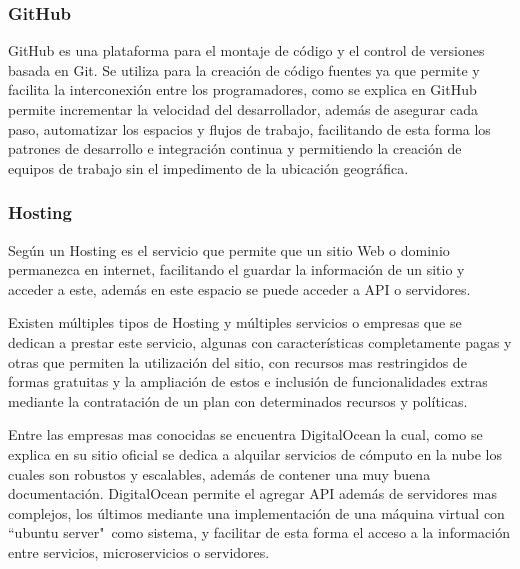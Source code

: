 \subsubsection{GitHub}
GitHub es una plataforma para el montaje de  código y el control de versiones
basada en Git. Se utiliza para la creación de código fuentes ya que permite y
facilita la interconexión entre los programadores, como se explica en \textcite{github}
 GitHub  permite incrementar la velocidad del desarrollador, además de asegurar
cada paso, automatizar los espacios y flujos de trabajo, facilitando de esta
forma los patrones de desarrollo e integración continua y permitiendo la creación
de equipos de trabajo sin el impedimento de la ubicación geográfica.

\subsubsection{Hosting}
Según \textcite{Hosting} un Hosting es el servicio que permite que un sitio
Web o dominio permanezca en internet, facilitando el guardar la información de un sitio
y acceder a este, además en este espacio se puede acceder a API o servidores.

Existen múltiples tipos de Hosting y múltiples servicios o empresas que se
dedican a prestar este servicio, algunas con características completamente pagas
y otras que permiten la utilización del sitio, con recursos mas restringidos de
formas gratuitas y la ampliación de estos e inclusión de funcionalidades extras
mediante la contratación de un plan con determinados recursos y políticas.

Entre las empresas mas conocidas se encuentra DigitalOcean  la cual, como se
explica en su sitio oficial \textcite{DigitalOcean} se dedica a alquilar servicios
de cómputo en la nube los cuales son robustos y escalables, además de contener
una muy buena documentación. DigitalOcean permite el agregar API además de
servidores mas complejos, los últimos mediante una implementación de una máquina
virtual con ``ubuntu server"\ como sistema, y facilitar de esta forma el acceso
a la información entre servicios, microservicios o servidores.
